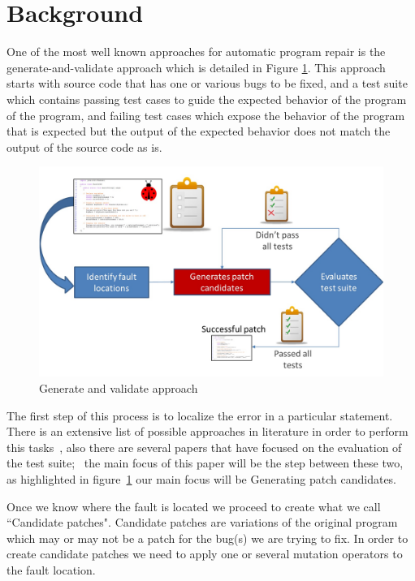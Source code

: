 \documentclass[conference]{IEEEtran}
\begin{document}
\section{Background}


One of the most well known approaches for automatic program repair is the
generate-and-validate approach which is detailed in Figure
\ref{fig:generateandvalidate}. This approach starts with source code that
has one or various bugs to be fixed, and a test suite which contains passing
test cases to guide the expected behavior of the program of the program, and failing test 
cases which expose the behavior of the program that is expected but the output
of the expected behavior does not match the output of the source code as is.



\begin{figure}[!h]
  \centering
    \includegraphics[scale=0.25]{Picture1}
  \caption{Generate and validate approach}
  \label{fig:generateandvalidate}
\end{figure}

The first step of this process is to localize the error in a particular 
statement. There is an extensive list of possible approaches in literature in 
order to perform this tasks~\cite{Jones05,Jones02,Chen02,legoues12,Qi13}, also there are several papers that have focused on the evaluation of the test suite;~\cite{Qi13,fan15} the main focus of this paper will be the step between these two, as highlighted in figure~\ref{fig:generateandvalidate} our main focus will be Generating patch candidates.

Once we know where the fault is located we proceed to create what we call 
``Candidate patches". Candidate patches are variations of the original program 
which may or may not be a patch for the bug(s) we are trying to fix. In order to 
create candidate patches we need to apply one or several mutation operators to 
the fault location. 
\end{document}
